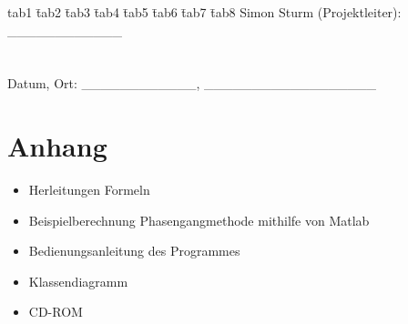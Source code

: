 \documentclass{fhnwreport}
\begin{document}
\begin{tabbing}
tab1 \= tab2 \= tab3 \= tab4 \= tab5 \=tab6 \= tab7 \= tab8 \kill
Simon Sturm (Projektleiter): \>\>\>\>\>\>\>\_\_\_\_\_\_\_\_\_\_\_\_\\
\\
\\
Datum, Ort: \>\>\>\>\>\>\>\_\_\_\_\_\_\_\_\_\_\_\_, \_\_\_\_\_\_\_\_\_\_\_\_\_\_\_\_\_\_\\
\end{tabbing}



\newpage

\listoffigures
\listoftables


\newpage
\section{Anhang}
\begin{itemize}
\item Herleitungen Formeln
\item Beispielberechnung Phasengangmethode mithilfe von Matlab
\item Bedienungsanleitung des Programmes 
\item Klassendiagramm
\item CD-ROM

\end{itemize}


 
\end{document}
